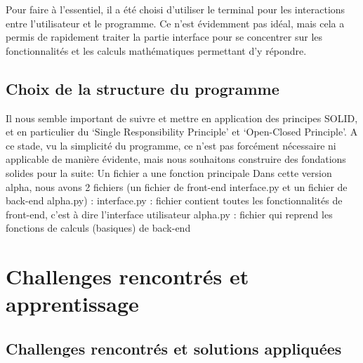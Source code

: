Pour faire à l'essentiel, il a été choisi d'utiliser le terminal pour les interactions entre l'utilisateur et le programme. 
Ce n’est évidemment pas idéal, mais cela a permis de rapidement traiter la partie interface pour se concentrer sur 
les fonctionnalités et les calculs mathématiques permettant d’y répondre.

\subsection{Choix de la structure du programme}

Il nous semble important de suivre et mettre en application des principes SOLID, et en particulier du 
‘Single Responsibility Principle’ et ‘Open-Closed Principle’. 
A ce stade, vu la simplicité du programme, ce n’est pas forcément nécessaire ni applicable de manière évidente, 
mais nous souhaitons construire des fondations solides pour la suite:
Un fichier a une fonction principale
Dans cette version alpha, nous avons 2 fichiers (un fichier de front-end interface.py et un fichier de back-end alpha.py) :
interface.py : fichier contient toutes les fonctionnalités de front-end, c’est à dire l’interface utilisateur
alpha.py : fichier qui reprend les fonctions de calculs (basiques) de back-end


\section{Challenges rencontrés et apprentissage}

\subsection{Challenges rencontrés et solutions appliquées}

